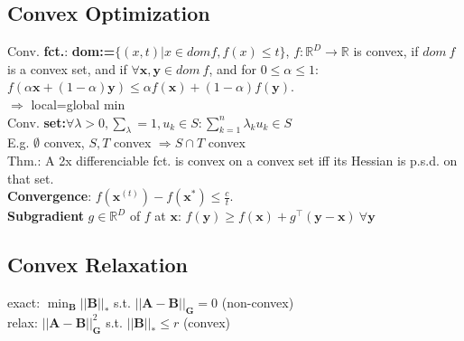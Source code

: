 \subsection*{Convex Optimization}
Conv. \textbf{fct.}: \textbf{dom:=}$\{(x,t)|x \in dom f, f(x) \leq t\}$, $f : \mathbb{R}^D \rightarrow \mathbb{R}$ is convex, if $dom\ f$ is a convex set, and if $\forall \mathbf{x}, \mathbf{y} \in dom\ f$, and for $0 \leq \alpha \leq 1$: $f(\alpha \mathbf{x} + (1 - \alpha)\mathbf{y}) \leq \alpha f(\mathbf{x}) + (1-\alpha)f(\mathbf{y})$.\\
$\Rightarrow$ local=global min\\
Conv. \textbf{set:}$\forall \lambda >0, \sum_\lambda = 1, u_k\in S: \sum_{k=1}^{n}\lambda_k u_k \in S$\\
E.g. $\emptyset$ convex, $S, T$ convex $\Rightarrow S\cap T$ convex\\
Thm.: A 2x differenciable fct. is convex on a convex set iff its Hessian is p.s.d. on that set.\\
\textbf{Convergence}: $f(\mathbf{x}^{(t)}) - f(\mathbf{x}^*) \le \frac{c}{t}$.\\
\textbf{Subgradient} $g \in \mathbb{R}^D$ of $f$ at $\mathbf{x}$: $f(\mathbf{y}) \geq f(\mathbf{x}) + g^\top(\mathbf{y}-\mathbf{x}) \ \forall \mathbf{y}$

\subsection*{Convex Relaxation}
exact: $ \min_{ \mathbf{B} } || \mathbf{B} ||_{*}$ s.t. $|| \mathbf{A} - \textbf{B}  ||_{\mathbf{G}}=0$ (non-convex)\\
relax: $ || \mathbf{A} - \textbf{B}  ||_{\mathbf{G}}^2$ s.t. $ || \mathbf{B} ||_{*} \le r$ (convex)
